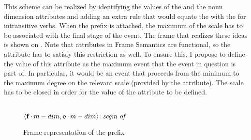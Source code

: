 This scheme can be realized by identifying the values of the  and the noun dimension attributes and adding an extra rule that would equate the  with the  for intransitive verbs. When the prefix is attached, the maximum of the scale has to be associated with the final stage of the event. The frame that realizes these ideas is shown on . Note that attributes in Frame Semantics are functional, so the attribute \PARTOF has to satisfy this restriction as well. To ensure this, I propose to define the value of this attribute as  the maximum event that the event in question is part of. In particular, it would be an event that proceeds from the minimum to the maximum degree on the relevant scale (provided by the \MDIM attribute). The scale has to be closed in order for the value of the \PARTOF attribute to be defined.

\begin{figure}
\begin{minipage}{0.45\textwidth}
 \end{minipage}\hfill%
 \begin{minipage}{0.45\textwidth}\centering
{}\\
$\langle{\textbf{\textrm{f}}\,{\cdot}\,m-dim,\textbf{\textrm{e}}\,{\cdot}\,m-dim}\rangle\,{:}\,\textit{segm-of}$\\[1ex]
\end{minipage}
\caption{Frame representation of the prefix  \label{frame:do}}
\end{figure}

